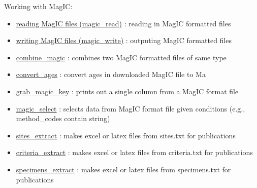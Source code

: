 \documentclass[11pt]{book}
\begin{document}
{{Working with MagIC:
\begin{itemize}
\item \href{https://pmagpy.github.io/PmagPy_MagIC.html#reading MagIC files}{reading MagIC files (magic\_read)} : reading in MagIC formatted files
\item \href{https://pmagpy.github.io/PmagPy_MagIC.html#writing MagIC files}{writing MagIC files (magic\_write)} : outputing MagIC formatted files
\item \href{https://pmagpy.github.io/PmagPy_MagIC.html#combine_magic}{combine\_magic} : combines two MagIC formatted files of same type
\item \href{https://pmagpy.github.io/PmagPy_MagIC.html#convert_ages}{convert\_ages} : convert ages in downloaded MagIC file to Ma
\item \href{https://pmagpy.github.io/PmagPy_MagIC.html#grab_magic_key}{grab\_magic\_key} : prints out a single column from a MagIC format file
\item \href{https://pmagpy.github.io/PmagPy_MagIC.html#magic_select}{magic\_select} : selects data from MagIC format file given conditions (e.g., method_codes contain string)
\item \href{https://pmagpy.github.io/PmagPy_MagIC.html#sites_extract}{sites\_extract} : makes excel or latex files from sites.txt for publications
\item \href{https://pmagpy.github.io/PmagPy_MagIC.html#criteria_extract}{criteria\_extract} : makes excel or latex files from criteria.txt for publications
\item \href{https://pmagpy.github.io/PmagPy_MagIC.html#specimens_extract}{specimens\_extract} : makes excel or latex files from specimens.txt for publications


\end{itemize}}}
\end{document}
